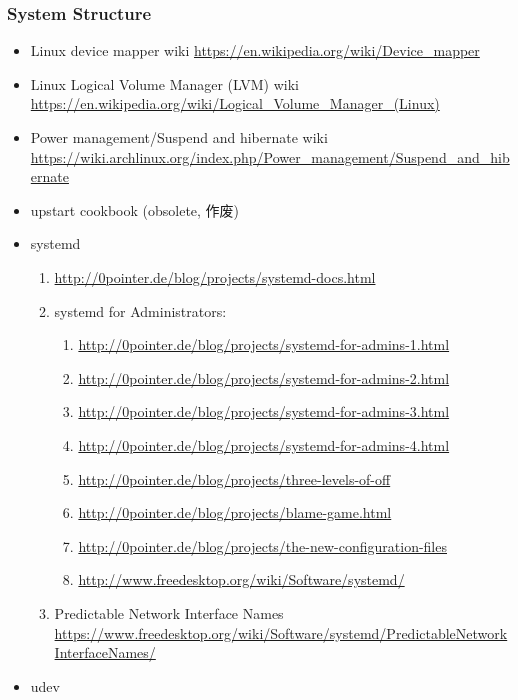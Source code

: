 \documentclass{article}
\begin{document}
\subsubsection{System Structure}
%
\begin{itemize}
    \item Linux device mapper wiki \url{https://en.wikipedia.org/wiki/Device_mapper}
    \item Linux Logical Volume Manager (LVM) wiki \url{https://en.wikipedia.org/wiki/Logical_Volume_Manager_(Linux)}
    \item Power management/Suspend and hibernate wiki \url{https://wiki.archlinux.org/index.php/Power_management/Suspend_and_hibernate}
    \item upstart cookbook (obsolete, 作废)
    \item systemd
        \begin{enumerate}
            \item \url{http://0pointer.de/blog/projects/systemd-docs.html}
            \item systemd for Administrators:
                \begin{enumerate}
                    \item \url{http://0pointer.de/blog/projects/systemd-for-admins-1.html}
                    \item \url{http://0pointer.de/blog/projects/systemd-for-admins-2.html}
                    \item \url{http://0pointer.de/blog/projects/systemd-for-admins-3.html}
                    \item \url{http://0pointer.de/blog/projects/systemd-for-admins-4.html}
                    \item \url{http://0pointer.de/blog/projects/three-levels-of-off}
                    \item \url{http://0pointer.de/blog/projects/blame-game.html}
                    \item \url{http://0pointer.de/blog/projects/the-new-configuration-files}
                    \item \url{http://www.freedesktop.org/wiki/Software/systemd/}
                \end{enumerate}
            \item Predictable Network Interface Names \url{https://www.freedesktop.org/wiki/Software/systemd/PredictableNetworkInterfaceNames/}
        \end{enumerate}
    \item udev
        \begin{itemize}

\end{itemize}
\end{itemize}
\end{document}
